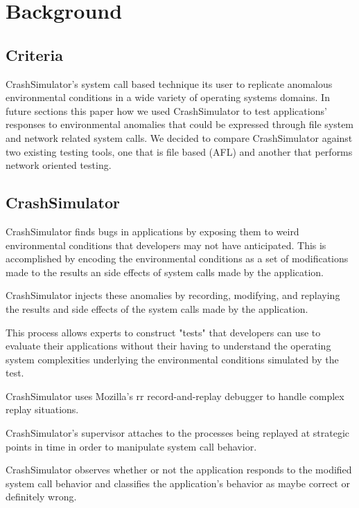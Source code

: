 \section{Background}
\label{SEC:background}

\subsection{Criteria}

 CrashSimulator's system call based
technique its user to replicate anomalous environmental conditions in a
wide variety of operating systems domains.  In future sections this paper
how we used CrashSimulator to test applications' responses to environmental
anomalies that could be expressed through file system and network related
system calls.  We decided to compare CrashSimulator against two existing
testing tools, one that is file based (AFL) and another that performs
network oriented testing.

\subsection{CrashSimulator}

CrashSimulator finds bugs in applications by exposing them to weird
environmental conditions that developers may not have anticipated.  This is
accomplished by encoding the environmental conditions as a set of
modifications made to the results an side effects of system calls made by
the application.

CrashSimulator injects these anomalies by recording, modifying, and
replaying the results and side effects of the system calls made by the
application.

This process allows experts to construct "tests" that developers can use to
evaluate their applications without their having to understand the
operating system complexities underlying the environmental conditions
simulated by the test.

CrashSimulator uses Mozilla's rr record-and-replay debugger to handle
complex replay situations.

CrashSimulator's supervisor attaches to the processes being replayed at
strategic points in time in order to manipulate system call behavior.

CrashSimulator observes whether or not the application responds to the
modified system call behavior and classifies the application's behavior as
maybe correct or definitely wrong.

